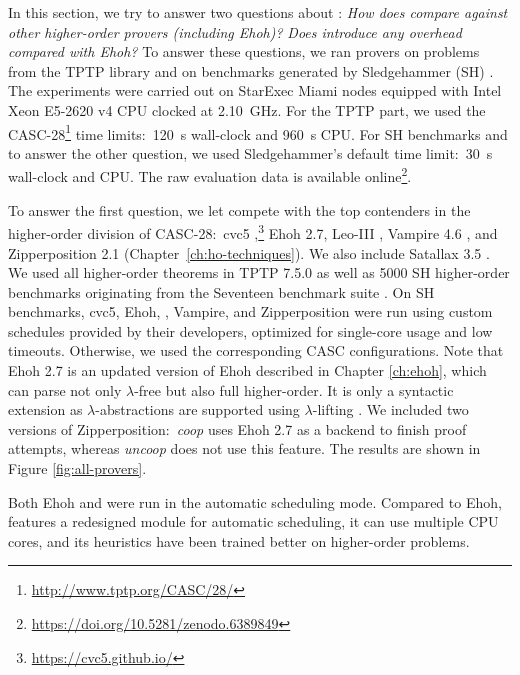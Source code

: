   In this section, we try to answer two questions about \ehohii{}: \emph{How does
  \ehohii{} compare against other higher-order provers (including Ehoh)?} \emph{Does
  \ehohii{} introduce any overhead compared with Ehoh?} To answer
  these questions, we ran provers on problems from the TPTP library \cite{gs-17-tptp} and on
  benchmarks generated by Sledgehammer (SH) \cite{pb-12-sh}.
  The experiments were carried out on StarExec Miami
  \cite{sst-14-starexec} nodes equipped with Intel Xeon E5-2620 v4 CPU clocked at
  2.10~GHz. For the TPTP part, we used the CASC-28\footnote{\url{http://www.tptp.org/CASC/28/}} time limits:\ 120~s
  wall-clock and 960~s CPU. For SH benchmarks and to answer the other question, we used Sledgehammer's
  default time limit:\ 30~s wall-clock and CPU.  The raw evaluation data is available online\footnote{\url{https://doi.org/10.5281/zenodo.6389849}}.

  
  To answer the first question, we let
  \ehohii{} compete with the top contenders in the higher-order division of
  CASC-28:\ cvc5 ,\footnote{\url{https://cvc5.github.io/}}
  Ehoh 2.7, Leo-III  \cite{sb-21-leo3}, Vampire 4.6
  \cite{br-20-full-sup-w-combs}, and Zipperposition 2.1 (Chapter~\ref{ch:ho-techniques}). 
  We also include Satallax 3.5
  \cite{cb-12-satallax}. We used all  higher-order
  theorems in TPTP 7.5.0 as well as 5000 SH higher-order benchmarks
  originating from the Seventeen benchmark suite \cite{desharnais-et-al-202x}.
  On SH benchmarks,
  cvc5, Ehoh, \ehohii{}, Vampire, and Zipperposition were run using custom schedules provided by
  their developers, optimized for single-core usage and low timeouts.
  Otherwise, we used the corresponding CASC configurations.
  Note that Ehoh 2.7 is an updated version of Ehoh described in Chapter
  \ref{ch:ehoh}, which can parse not only $\lambda$-free but also full
  higher-order. It is only a syntactic extension as $\lambda$-abstractions are supported using $\lambda$-lifting \cite{rjmh-82-lifting}.
  We included two versions of Zipperposition:\ \emph{coop} uses Ehoh 2.7 as a backend to finish proof attempts,
  whereas \emph{uncoop} does not use this feature. The results
  are shown in Figure \ref{fig:all-provers}.
  
  Both Ehoh and \ehohii{} were run in the automatic scheduling mode. Compared to Ehoh,
  \ehohii{} features a redesigned module for automatic scheduling, it
  can use multiple CPU cores, and its heuristics have been trained better on higher-order problems.
  
